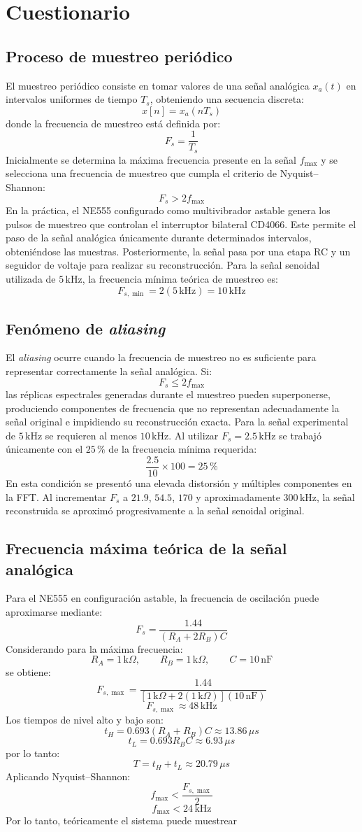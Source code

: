 \documentclass[conference]{IEEEtran}
\begin{document}
\section{Cuestionario} \subsection{Proceso de muestreo periódico} El muestreo periódico consiste en tomar valores de una señal analógica $x_a(t)$ en intervalos uniformes de tiempo $T_s$, obteniendo una secuencia discreta: \[ x[n]=x_a(nT_s) \] donde la frecuencia de muestreo está definida por: \[ F_s=\frac{1}{T_s} \] Inicialmente se determina la máxima frecuencia presente en la señal $f_{\max}$ y se selecciona una frecuencia de muestreo que cumpla el criterio de Nyquist--Shannon: \[ F_s>2f_{\max} \] En la práctica, el NE555 configurado como multivibrador astable genera los pulsos de muestreo que controlan el interruptor bilateral CD4066. Este permite el paso de la señal analógica únicamente durante determinados intervalos, obteniéndose las muestras. Posteriormente, la señal pasa por una etapa RC y un seguidor de voltaje para realizar su reconstrucción. Para la señal senoidal utilizada de $5\,\text{kHz}$, la frecuencia mínima teórica de muestreo es: \[ F_{s,\min}=2(5\,\text{kHz})=10\,\text{kHz} \] \subsection{Fenómeno de \textit{aliasing}} El \textit{aliasing} ocurre cuando la frecuencia de muestreo no es suficiente para representar correctamente la señal analógica. Si: \[ F_s\leq2f_{\max} \] las réplicas espectrales generadas durante el muestreo pueden superponerse, produciendo componentes de frecuencia que no representan adecuadamente la señal original e impidiendo su reconstrucción exacta. Para la señal experimental de $5\,\text{kHz}$ se requieren al menos $10\,\text{kHz}$. Al utilizar $F_s=2.5\,\text{kHz}$ se trabajó únicamente con el $25\,\%$ de la frecuencia mínima requerida: \[ \frac{2.5}{10}\times100=25\,\% \] En esta condición se presentó una elevada distorsión y múltiples componentes en la FFT. Al incrementar $F_s$ a $21.9$, $54.5$, $170$ y aproximadamente $300\,\text{kHz}$, la señal reconstruida se aproximó progresivamente a la señal senoidal original. \subsection{Frecuencia máxima teórica de la señal analógica} Para el NE555 en configuración astable, la frecuencia de oscilación puede aproximarse mediante: \[ F_s=\frac{1.44}{(R_A+2R_B)C} \] Considerando para la máxima frecuencia: \[ R_A=1\,\text{k}\Omega,\qquad R_B=1\,\text{k}\Omega,\qquad C=10\,\text{nF} \] se obtiene: \[ F_{s,\max}= \frac{1.44} {[1\,\text{k}\Omega+2(1\,\text{k}\Omega)](10\,\text{nF})} \] \[ F_{s,\max}\approx48\,\text{kHz} \] Los tiempos de nivel alto y bajo son: \[ t_H=0.693(R_A+R_B)C\approx13.86\,\mu s \] \[ t_L=0.693R_BC\approx6.93\,\mu s \] por lo tanto: \[ T=t_H+t_L\approx20.79\,\mu s \] Aplicando Nyquist--Shannon: \[ f_{\max}<\frac{F_{s,\max}}{2} \] \[ \boxed{f_{\max}<24\,\text{kHz}} \] Por lo tanto, teóricamente el sistema puede muestrear 
\end{document}
